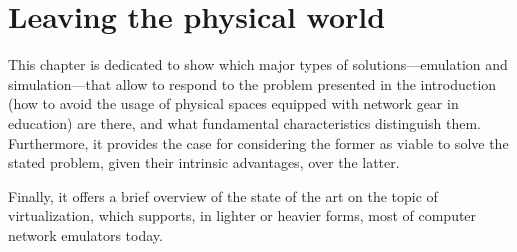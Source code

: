 
\chapter{Leaving the physical world}
\label{ch:leavingthephysicalworld}

This chapter is dedicated to show which major types of solutions---emulation and simulation---that allow to respond to the problem presented in the introduction (how to avoid the usage of physical spaces equipped with network gear in education) are there, and what fundamental characteristics distinguish them.
Furthermore, it provides the case for considering the former as viable to solve the stated problem, given their intrinsic advantages, over the latter.

Finally, it offers a brief overview of the state of the art on the topic of virtualization, which supports, in lighter or heavier forms, most of computer network emulators today.






% 

